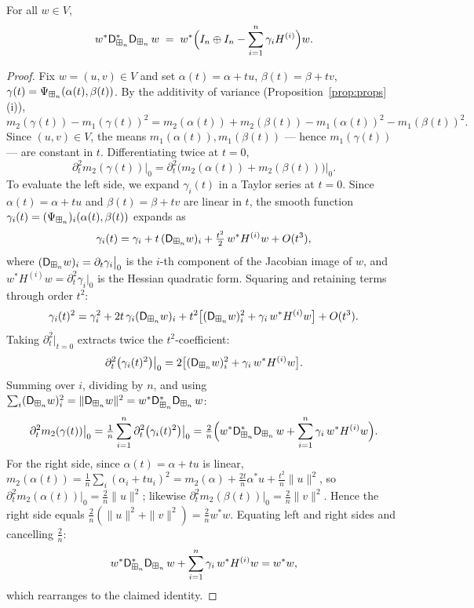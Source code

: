 \begin{qfourlemma}\label{lem:hess}
For all $w\in V$,
\[
w^\ast \mathsf{D}_{\boxplus_n}^\ast\mathsf{D}_{\boxplus_n}\, w
\;=\;w^\ast\Bigl(I_n\oplus I_n-\sum_{i=1}^n\gamma_i H^{(i)}\Bigr)w.
\]
\end{qfourlemma}

\begin{proof}
Fix $w=(u,v)\in V$ and set $\alpha(t)=\alpha+tu$, $\beta(t)=\beta+tv$,
$\gamma(t)=\Psi_{\boxplus_n}(\alpha(t),\beta(t))$. By the additivity of variance
(Proposition~\ref{prop:props}(i)),
\[
m_2(\gamma(t))-m_1(\gamma(t))^2
=m_2(\alpha(t))+m_2(\beta(t))-m_1(\alpha(t))^2-m_1(\beta(t))^2 .
\]
Since $(u,v)\in V$, the means $m_1(\alpha(t)),m_1(\beta(t))$ — hence
$m_1(\gamma(t))$ — are constant in $t$. Differentiating twice at $t=0$,
\[
\partial_t^2 m_2(\gamma(t))\big|_0=\partial_t^2\bigl(m_2(\alpha(t))+m_2(\beta(t))\bigr)\big|_0 .
\]
To evaluate the left side, we expand $\gamma_i(t)$ in a Taylor series at $t=0$.
Since $\alpha(t)=\alpha+tu$ and $\beta(t)=\beta+tv$ are linear in $t$, the smooth
function $\gamma_i(t)=(\Psi_{\boxplus_n})_i(\alpha(t),\beta(t))$ expands as
\[
\gamma_i(t) = \gamma_i + t\,(\mathsf{D}_{\boxplus_n} w)_i + \tfrac{t^2}{2}\,w^\ast H^{(i)}w + O(t^3),
\]
where $(\mathsf{D}_{\boxplus_n} w)_i = \partial_t\gamma_i\big|_0$ is the $i$-th component of the
Jacobian image of $w$, and $w^\ast H^{(i)}w = \partial_t^2\gamma_i\big|_0$ is the
Hessian quadratic form. Squaring and retaining terms through order $t^2$:
\[
\gamma_i(t)^2 = \gamma_i^2 + 2t\,\gamma_i(\mathsf{D}_{\boxplus_n} w)_i
  + t^2\bigl[(\mathsf{D}_{\boxplus_n} w)_i^2 + \gamma_i\,w^\ast H^{(i)}w\bigr] + O(t^3).
\]
Taking $\partial_t^2\big|_{t=0}$ extracts twice the $t^2$-coefficient:
\[
\partial_t^2\bigl(\gamma_i(t)^2\bigr)\big|_0
  = 2\bigl[(\mathsf{D}_{\boxplus_n} w)_i^2 + \gamma_i\,w^\ast H^{(i)}w\bigr].
\]
Summing over $i$, dividing by $n$, and using $\sum_i(\mathsf{D}_{\boxplus_n} w)_i^2
=\|\mathsf{D}_{\boxplus_n} w\|^2=w^\ast\mathsf{D}_{\boxplus_n}^\ast\mathsf{D}_{\boxplus_n}\,w$:
\[
\partial_t^2 m_2(\gamma(t))\big|_0
  = \tfrac{1}{n}\sum_{i=1}^n \partial_t^2\bigl(\gamma_i(t)^2\bigr)\big|_0
  = \tfrac{2}{n}\Bigl(w^\ast\mathsf{D}_{\boxplus_n}^\ast\mathsf{D}_{\boxplus_n}\,w
    + \sum_{i=1}^n\gamma_i\,w^\ast H^{(i)}w\Bigr).
\]
For the right side, since $\alpha(t)=\alpha+tu$ is linear,
$m_2(\alpha(t))=\tfrac1n\sum_i(\alpha_i+tu_i)^2
=m_2(\alpha)+\tfrac{2t}{n}\alpha^\ast u+\tfrac{t^2}{n}\|u\|^2$,
so $\partial_t^2 m_2(\alpha(t))\big|_0=\tfrac{2}{n}\|u\|^2$;
likewise $\partial_t^2 m_2(\beta(t))\big|_0=\tfrac{2}{n}\|v\|^2$.
Hence the right side equals $\tfrac{2}{n}(\|u\|^2+\|v\|^2)=\tfrac{2}{n}w^\ast w$.
Equating left and right sides and cancelling $\tfrac{2}{n}$:
\[
w^\ast\mathsf{D}_{\boxplus_n}^\ast\mathsf{D}_{\boxplus_n}\,w + \sum_{i=1}^n\gamma_i\,w^\ast H^{(i)}w = w^\ast w,
\]
which rearranges to the claimed identity.
\end{proof}

